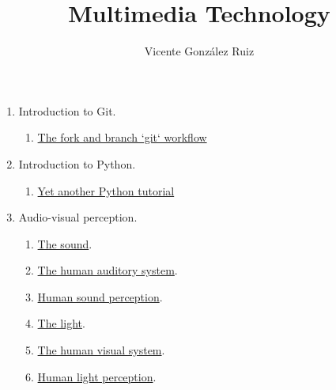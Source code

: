 \title{Multimedia Technology}
\author{Vicente González Ruiz}

\maketitle

\begin{enumerate}
  
\item Introduction to Git.
  \begin{enumerate}
  \item \href{https://github.com/vicente-gonzalez-ruiz/fork_and_branch_git_workflow}{The fork and branch `git` workflow}
  \end{enumerate}

\item Introduction to Python.
  \begin{enumerate}
  \item \href{https://github.com/vicente-gonzalez-ruiz/YAPT}{Yet another Python tutorial}
  \end{enumerate}

\item Audio-visual perception.
  \begin{enumerate}
  \item \href{https://cdn.rawgit.com/vicente-gonzalez-ruiz/The_Sound/master/index.html}{The sound}.
  \item \href{https://cdn.rawgit.com/vicente-gonzalez-ruiz/The_Human_Auditory_System/master/index.html}{The human auditory system}.
  \item \href{https://cdn.rawgit.com/vicente-gonzalez-ruiz/Human_Sound_Perception/master/index.html}{Human sound perception}.
  \item \href{https://cdn.rawgit.com/vicente-gonzalez-ruiz/the_light/master/index.html}{The light}.
  \item \href{https://cdn.rawgit.com/vicente-gonzalez-ruiz/the_human_visual_system/master/index.html}{The human visual system}.
  \item \href{https://cdn.rawgit.com/vicente-gonzalez-ruiz/Human_Light_Perception/master/index.html}{Human light perception}.
  \end{enumerate}
  

\end{enumerate}
